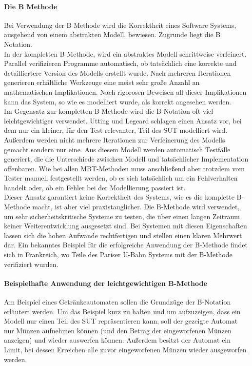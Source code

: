 \paragraph{Die B Methode}
\label{sec:bmethod}
Bei Verwendung der B Methode wird die Korrektheit eines Software Systems, ausgehend von einem abstrakten Modell, bewiesen. Zugrunde liegt die B Notation.\\
In der kompletten B Methode, wird ein abstraktes Modell schrittweise verfeinert. Parallel verifizieren Programme automatisch, ob tatsächlich eine korrekte und detailliertere Version des Modells erstellt wurde. Nach mehreren Iterationen generieren erhältliche Werkzeuge eine meist sehr große Anzahl an mathematischen Implikationen. Nach rigorosen Beweisen all dieser Implikationen kann das System, so wie es modelliert wurde, als korrekt angesehen werden.\\
Im Gegensatz zur kompletten B Methode wird die B Notation oft viel leichtgewichtiger verwendet. Utting und Legeard \cite{utting_practical_2007} schlagen einen Ansatz vor, bei dem nur ein kleiner, für den Test relevanter, Teil des \Gls{SUT} modelliert wird. Außerdem werden nicht mehrere Iterationen zur Verfeinerung des Modells gemacht sondern nur eine. Aus diesem Modell werden automatisch Testfälle generiert, die die Unterschiede zwischen Modell und tatsächlicher Implementation offenbaren. Wie bei allen MBT-Methoden muss anschließend aber trotzdem vom Tester manuell festgestellt werden, ob es sich tatsächlich um ein Fehlverhalten handelt oder, ob ein Fehler bei der Modellierung passiert ist.\\
Dieser Ansatz garantiert keine Korrektheit des Systems, wie es die komplette B-Methode macht, ist aber viel praxistauglicher. Die B-Methode wird verwendet, um sehr sicherheitskritische Systeme zu testen, die über einen langen Zeitraum keiner Weiterentwicklung ausgesetzt sind. Bei Systemen mit diesen Eigenschaften lassen sich die hohen Aufwände rechtfertigen und stellen einen klaren Mehrwert dar. Ein bekanntes Beispiel für die erfolgreiche Anwendung der B-Methode findet sich in Frankreich, wo Teile des Pariser U-Bahn Systems mit der B-Methode verifiziert wurden. \cite{lecomte_formal_2007}

\paragraph{Beispielhafte Anwendung der leichtgewichtigen B-Methode}
Am Beispiel eines Getränkeautomaten sollen die Grundzüge der B-Notation erläutert werden. Um das Beispiel kurz zu halten und um aufzuzeigen, dass ein Modell nur einen Teil des \Gls{SUT} repräsentieren kann, soll der gezeigte Automat nur Münzen aufnehmen können (und den Betrag der eingeworfenen Münzen anzeigen) und wieder auswerfen können. Außerdem besitzt der Automat ein Limit, bei dessen Erreichen alle zuvor eingeworfenen Münzen wieder ausgeworfen werden.

